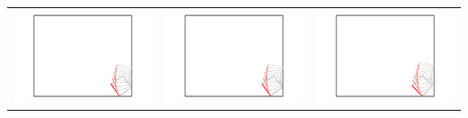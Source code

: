 \documentclass[11pt]{article}
\begin{document}
\begin{center}
\begin{tabular}{ccc}
\includegraphics[scale = 0.26]{simA_02.pdf} & \includegraphics[scale = 0.26]{simB_02.pdf} & \includegraphics[scale = 0.26]{simC_02.pdf} \\

\end{tabular}
\end{center}
\end{document}
